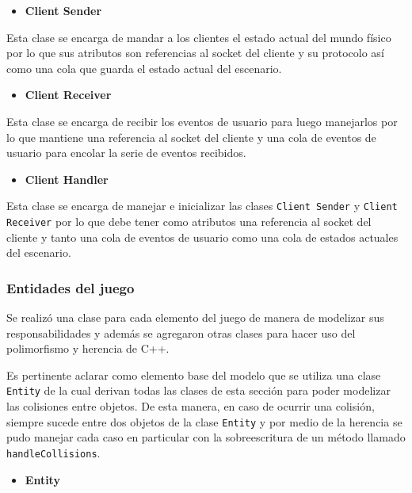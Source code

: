 \documentclass[a4paper]{article}
\begin{document}
\begin{itemize}
	\item \textbf{Client Sender}
\end{itemize}

Esta clase se encarga de mandar a los clientes el estado actual del mundo físico por lo que sus atributos son referencias al socket del cliente y su protocolo así como una cola que guarda el estado actual del escenario.

\begin{itemize}
	\item \textbf{Client Receiver}
\end{itemize}

Esta clase se encarga de recibir los eventos de usuario para luego manejarlos por lo que mantiene una referencia al socket del cliente y una cola de eventos de usuario para encolar la serie de eventos recibidos.

\begin{itemize}
	\item \textbf{Client Handler}
\end{itemize}

Esta clase se encarga de manejar e inicializar las clases \texttt{Client Sender} y \texttt{Client Receiver} por lo que debe tener como atributos una referencia al socket del cliente y tanto una cola de eventos de usuario como una cola de estados actuales del escenario.
	
\subsubsection{Entidades del juego}

Se realizó una clase para cada elemento del juego de manera de modelizar sus responsabilidades y además se agregaron otras clases para hacer uso del polimorfismo y herencia de C++.

Es pertinente aclarar como elemento base del modelo que se utiliza una clase \texttt{Entity} de la cual derivan todas las clases de esta sección para poder modelizar las colisiones entre objetos. De esta manera, en caso de ocurrir una colisión, siempre sucede entre dos objetos de la clase \texttt{Entity} y por medio de la herencia se pudo manejar cada caso en particular con la sobreescritura de un método llamado \texttt{handleCollisions}. 

\begin{itemize}
	\item \textbf{Entity}
\end{itemize}
\end{document}
